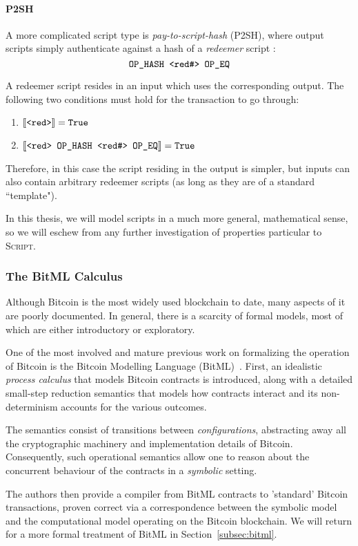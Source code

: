 \documentclass[acmsmall,nonacm=true,screen=true]{acmart}
\begin{document}
\paragraph{P2SH}
A more complicated script type is \textit{pay-to-script-hash} (P2SH), where output scripts simply authenticate
against a hash of a \textit{redeemer} script :
\[
  \text{\texttt{OP\_HASH <red\#> OP\_EQ}}
\]

A redeemer script  resides in an input which uses the corresponding output. The following two conditions
must hold for the transaction to go through:
\begin{enumerate}
\item $\llbracket \text{\texttt{<red>}} \rrbracket = \text{\texttt{True}}$
\item $\llbracket \text{\texttt{<red> OP\_HASH <red\#> OP\_EQ}} \rrbracket = \text{\texttt{True}}$
\end{enumerate}
Therefore, in this case the script residing in the output is simpler, but inputs can also contain arbitrary redeemer scripts
(as long as they are of a standard ``template").

In this thesis, we will model scripts in a much more general, mathematical sense, so
we will eschew from any further investigation of properties particular to \textsc{Script}.

\subsubsection{The BitML Calculus}
Although Bitcoin is the most widely used blockchain to date, many aspects of it are poorly documented.
In general, there is a scarcity of formal models, most of which are either introductory or exploratory.

One of the most involved and mature previous work on formalizing the operation of Bitcoin
is the Bitcoin Modelling Language (BitML)~\cite{bitml}. First, an idealistic \textit{process calculus}
that models Bitcoin contracts is introduced, along with a detailed small-step reduction semantics that
models how contracts interact and its non-determinism accounts for the various outcomes.

The semantics consist of transitions between \textit{configurations}, abstracting away all the
cryptographic machinery and implementation details of Bitcoin.
Consequently, such operational semantics allow one to reason about the concurrent behaviour of
the contracts in a \textit{symbolic} setting.

The authors then provide a compiler from BitML contracts to 'standard' Bitcoin transactions, proven
correct via a correspondence between the symbolic model and the computational model operating on
the Bitcoin blockchain. We will return for a more formal treatment of BitML in Section~\ref{subsec:bitml}.
\end{document}
